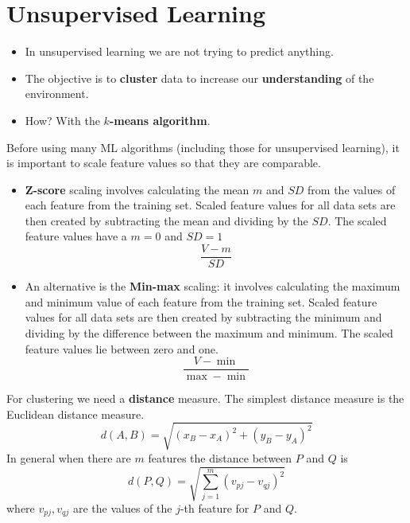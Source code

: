 \section{Unsupervised Learning}

\begin{itemize}
    \item In unsupervised learning we are not trying to predict anything.
    \item The objective is to \textbf{cluster} data to increase our \textbf{understanding} of the environment.
    \item How? With the \textbf{$k$-means algorithm}.
\end{itemize}

Before using many ML algorithms (including those for unsupervised learning), it is important to scale feature values so that they are comparable.
\begin{itemize}
    \item \textbf{Z-score} scaling involves calculating the mean $m$ and $SD$ from the values of each feature from the training set. Scaled feature values for all data sets are then created by subtracting the mean and dividing by the $SD$. The scaled feature values have a $m=0$ and $SD=1$
          \begin{equation*}
              \frac{V-m}{SD}
          \end{equation*}
    \item An alternative is the \textbf{Min-max} scaling: it involves calculating the maximum and minimum value of each feature from the training set. Scaled feature values for all data sets are then created by subtracting the minimum and dividing by the difference between the maximum and minimum. The scaled feature values lie between zero and one.
          \begin{equation*}
              \frac{V-\min}{\max -\min}
          \end{equation*}
\end{itemize}

For clustering we need a \textbf{distance} measure. The simplest distance measure is the Euclidean distance measure.
\begin{equation*}
    d\left( A,B\right) =\sqrt{\left( x_{B} -x_{A}\right)^{2} +\left( y_{B} -y_{A}\right)^{2}}
\end{equation*}
In general when there are $m$ features the distance between $P$ and $Q$ is
\begin{equation*}
    d\left( P,Q\right) =\sqrt{\sum\limits _{j=1}^{m}\left( v_{pj} -v_{qj}\right)^{2}}
\end{equation*}
where $v_{pj} ,v_{qj}$ are the values of the $j$-th feature for $P$ and $Q$.

